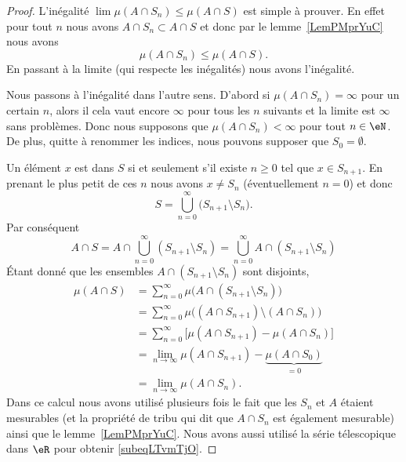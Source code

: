 \begin{proof}
    L'inégalité \( \lim\mu(A\cap S_n)\leq \mu(A\cap S)\) est simple à prouver. En effet pour tout \( n\) nous avons \( A\cap S_n\subset A\cap S\) et donc par le lemme~\ref{LemPMprYuC} nous avons
    \begin{equation}
        \mu(A\cap S_n)\leq\mu(A\cap S).
    \end{equation}
    En passant à la limite (qui respecte les inégalités) nous avons l'inégalité.

    Nous passons à l'inégalité dans l'autre sens. D'abord si \( \mu(A\cap S_n)=\infty\) pour un certain \( n\), alors il cela vaut encore \( \infty\) pour tous les \( n\) suivants et la limite est \( \infty\) sans problèmes. Donc nous supposons que \( \mu(A\cap S_n)<\infty\) pour tout \( n\in \eN\). De plus, quitte à renommer les indices, nous pouvons supposer que \( S_0=\emptyset\).

    Un élément \( x\) est dans \( S\) si et seulement s'il existe \( n\geq 0\) tel que \( x\in S_{n+1}\). En prenant le plus petit de ces \( n\) nous avons \( x\neq S_n\) (éventuellement \( n=0\)) et donc
    \begin{equation}
        S=\bigcup_{n=0}^{\infty}\big( S_{n+1}\setminus S_n \big).
    \end{equation}
    Par conséquent
    \begin{equation}
            A\cap S=A\cap\bigcup_{n=0}^{\infty}(S_{n+1}\setminus S_n)
            =\bigcup_{n=0}^{\infty}A\cap(S_{n+1}\setminus S_n)
    \end{equation}
    Étant donné que les ensembles \( A\cap(S_{n+1}\setminus S_n)\) sont disjoints,
    \begin{subequations}
        \begin{align}
            \mu(A\cap S)&=\sum_{n=0}^{\infty}\mu\big( A\cap(S_{n+1}\setminus S_n) \big)\\
            &=\sum_{n=0}^{\infty}\mu\Big( (A\cap S_{n+1})\setminus (A\cap S_n) \Big)\\
            &=\sum_{n=0}^{\infty}\big[ \mu(A\cap S_{n+1})-\mu(A\cap S_n) \big]\\
            &=\lim_{n\to \infty} \mu(A\cap S_{n+1})-\underbrace{\mu(A\cap S_0)}_{=0}\label{subeqLTvmTjO}\\
            &=\lim_{n\to \infty} \mu(A\cap S_n).
        \end{align}
    \end{subequations}
    Dans ce calcul nous avons utilisé plusieurs fois le fait que les \( S_n\) et \( A\) étaient mesurables (et la propriété de tribu qui dit que \( A\cap S_n\) est également mesurable) ainsi que le lemme~\ref{LemPMprYuC}. Nous avons aussi utilisé la série télescopique dans \( \eR\) pour obtenir \eqref{subeqLTvmTjO}.
\end{proof}

